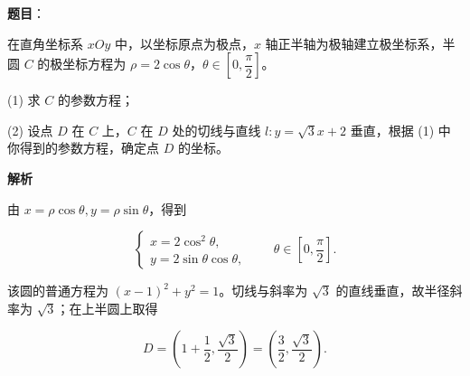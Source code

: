 \begin{answer}

\textbf{题目}：

在直角坐标系 $xOy$ 中，以坐标原点为极点，$x$ 轴正半轴为极轴建立极坐标系，半圆 $C$ 的极坐标方程为 $\rho=2\cos\theta$，$\theta\in\left[0,\dfrac\pi2\right]$。

(1) 求 $C$ 的参数方程；

(2) 设点 $D$ 在 $C$ 上，$C$ 在 $D$ 处的切线与直线 $l:y=\sqrt3x+2$ 垂直，根据 (1) 中你得到的参数方程，确定点 $D$ 的坐标。

\textbf{解析}


由 $x=\rho\cos\theta,y=\rho\sin\theta$，得到

\nopagebreak[4]
\[
\begin{cases}
x=2\cos^2\theta,\\
y=2\sin\theta\cos\theta,
\end{cases}\qquad \theta\in\left[0,\frac\pi2\right].
\]


该圆的普通方程为 $(x-1)^2+y^2=1$。切线与斜率为 $\sqrt3$ 的直线垂直，故半径斜率为 $\sqrt3$；在上半圆上取得

\nopagebreak[4]
\[
D=\left(1+\frac12,\frac{\sqrt3}{2}\right)=\left(\frac32,\frac{\sqrt3}{2}\right).
\]



\end{answer}
